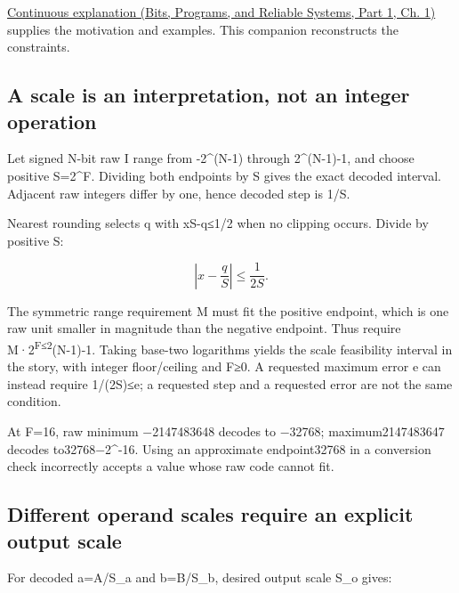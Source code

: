 \href{../01-Bits-Programs-and-Reliable-Systems-P01/main.pdf\#01-foundations-i-ch001-choosing-what-information-to-keep}{Continuous explanation (Bits, Programs, and Reliable Systems, Part 1, Ch. 1)} supplies the motivation and examples. This companion reconstructs the constraints.

\subsection{A scale is an interpretation, not an integer operation}\label{03-visual-computing-i-ch018-a-scale-is-an-interpretation-not-an-integer-operation}

\hypertarget{03-visual-computing-i-ch018-a-scale-is-an-interpretation-not-an-integer-operation}{}

Let signed N-bit raw I range from -2\^{}(N-1) through 2\^{}(N-1)-1, and choose positive S=2\^{}F. Dividing both endpoints by S gives the exact decoded interval. Adjacent raw integers differ by one, hence decoded step is 1/S.

Nearest rounding selects q with \textbar xS-q\textbar≤1/2 when no clipping occurs. Divide by positive S:

\[
\left|x-\frac qS\right|\le\frac1{2S}.
\]

The symmetric range requirement M must fit the positive endpoint, which is one raw unit smaller in magnitude than the negative endpoint. Thus require M·2\textsuperscript{F≤2}(N-1)-1. Taking base-two logarithms yields the scale feasibility interval in the story, with integer floor/ceiling and F≥0. A requested maximum error e can instead require 1/(2S)≤e; a requested step and a requested error are not the same condition.

At F=16, raw minimum −2147483648 decodes to −32768; maximum2147483647 decodes to32768−2\^{}-16. Using an approximate endpoint32768 in a conversion check incorrectly accepts a value whose raw code cannot fit.

\subsection{Different operand scales require an explicit output scale}\label{03-visual-computing-i-ch018-different-operand-scales-require-an-explicit-output-scale}

\hypertarget{03-visual-computing-i-ch018-different-operand-scales-require-an-explicit-output-scale}{}

For decoded a=A/S\_a and b=B/S\_b, desired output scale S\_o gives:

